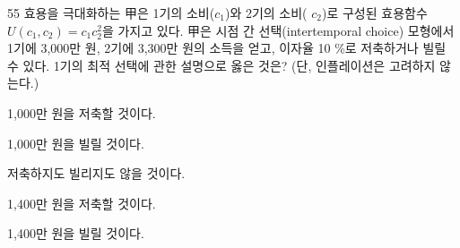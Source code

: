 \begin{question}{55}
효용을 극대화하는 甲은 1기의 소비($c_{1}$)와 2기의 소비( $c_{2}$)로 구성된 효용함수
$U(c_{1},c_{2})=c_{1}c_{2}^{2}$을 가지고 있다. 甲은 시점 간 선택(intertemporal choice) 모형에서 1기에 3,000만 원, 2기에 3,300만 원의 소득을 얻고, 이자율 10 \%로 저축하거나 빌릴 수 있다. 1기의 최적 선택에 관한 설명으로 옳은 것은? (단, 인플레이션은 고려하지 않는다.) \par
\begin{choices}
  \item 1,000만 원을 저축할 것이다.
  \item 1,000만 원을 빌릴 것이다.
  \item 저축하지도 빌리지도 않을 것이다.
  \item 1,400만 원을 저축할 것이다.
  \item 1,400만 원을 빌릴 것이다.
\end{choices}
\end{question}
